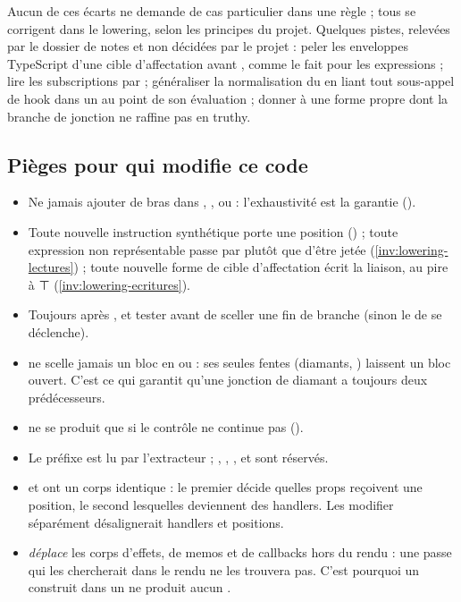 Aucun de ces écarts ne demande de cas particulier dans une règle ; tous se corrigent dans le lowering, selon les principes du projet. Quelques pistes, relevées par le dossier de notes et non décidées par le projet : peler les enveloppes TypeScript d'une cible d'affectation avant , comme  le fait pour les expressions ; lire les subscriptions par  ; généraliser la normalisation du  en liant tout sous-appel de hook dans un  au point de son évaluation ; donner à  une forme propre dont la branche de jonction ne raffine pas en truthy.

\subsection{Pièges pour qui modifie ce code}

\begin{piege}
\begin{itemize}
  \item Ne jamais ajouter de bras \code{_ => {}} dans , ,  ou  : l'exhaustivité est la garantie ().
  \item Toute nouvelle instruction synthétique porte une position () ; toute expression non représentable passe par  plutôt que d'être jetée (\cref{inv:lowering-lectures}) ; toute nouvelle forme de cible d'affectation écrit la liaison, au pire à ⊤ (\cref{inv:lowering-ecritures}).
  \item Toujours  après , et tester  avant de sceller une fin de branche (sinon le  de  se déclenche).
  \item {} ne scelle jamais un bloc en  ou  : ses seules fentes (diamants, ) laissent un bloc ouvert. C'est ce qui garantit qu'une jonction de diamant a toujours deux prédécesseurs.
  \item {} ne se produit que si le contrôle ne continue pas ().
  \item Le préfixe  est lu par l'extracteur ; , , ,  et  sont réservés.
  \item {} et  ont un corps identique : le premier décide quelles props reçoivent une position, le second lesquelles deviennent des handlers. Les modifier séparément désalignerait handlers et positions.
  \item {} \emph{déplace} les corps d'effets, de memos et de callbacks hors du rendu : une passe qui les chercherait dans le rendu ne les trouvera pas. C'est pourquoi un  construit dans un  ne produit aucun .
\end{itemize}
\end{piege}


